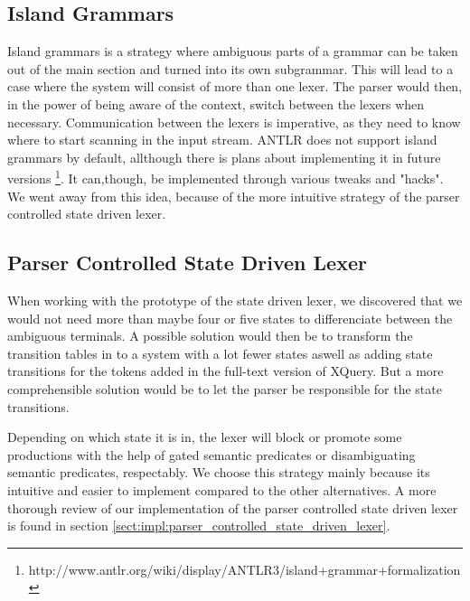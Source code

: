\subsection{Island Grammars}
\label{sect:amiguousgrammar:islandGrammar}
Island grammars \cite{islandGrammar} is a strategy where ambiguous parts of a grammar can be taken out of the main section and turned into its own subgrammar. This will lead to a case where the system will consist of more than one lexer. The parser would then, in the power of being aware of the context, switch between the lexers when necessary. Communication between the lexers is imperative, as they need to know where to start scanning in the input stream. ANTLR does not support island grammars by default, allthough there is plans about implementing it in future versions \footnote{http://www.antlr.org/wiki/display/ANTLR3/island+grammar+formalization}. It can,though, be implemented through various tweaks and "hacks". We went away from this idea, because of the more intuitive strategy of the parser controlled state driven lexer.

\subsection{Parser Controlled State Driven Lexer}
\label{sect:amiguousgrammar:parserControlled}
When working with the prototype of the state driven lexer, we discovered that we would not need more than maybe four or five states to differenciate between the ambiguous terminals. A possible solution would then be to transform the transition tables in \cite{createTokenizer} to a system with a lot fewer states aswell as adding state transitions for the tokens added in the full-text version of XQuery. But a more comprehensible solution would be to let the parser be responsible for the state transitions. 

Depending on which state it is in, the lexer will block or promote some productions with the help of gated semantic predicates or disambiguating semantic predicates, respectably. We choose this strategy mainly because its intuitive and easier to implement compared to the other alternatives. A more thorough review of our implementation of the parser controlled state driven lexer is found in section \ref{sect:impl:parser_controlled_state_driven_lexer}.

